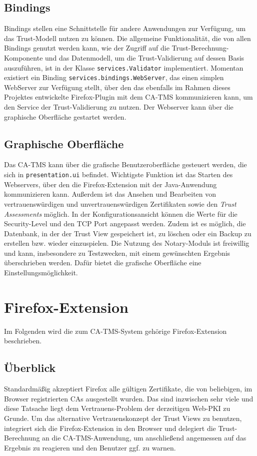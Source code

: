 \documentclass[accentcolor=tud1c,article,colorback,11pt]{tudreport}
\begin{document}
\subsection{Bindings}
Bindings stellen eine Schnittstelle für andere Anwendungen zur Verfügung, um das Trust-Modell nutzen zu können. Die allgemeine Funktionalität, die von allen Bindings genutzt werden kann, wie der Zugriff auf die Trust-Berechnung-Komponente und das Datenmodell, um die Trust-Validierung auf dessen Basis auszuführen, ist in der Klasse \texttt{services.Validator} implementiert. Momentan existiert ein Binding \texttt{services.bindings.WebServer}, das einen simplen WebServer zur Verfügung stellt, über den das ebenfalls im Rahmen dieses Projektes entwickelte Firefox-Plugin mit dem CA-TMS kommunizieren kann, um den Service der Trust-Validierung zu nutzen. Der Webserver kann über die graphische Oberfläche gestartet werden.

\subsection{Graphische Oberfläche}
Das CA-TMS kann über die grafische Benutzeroberfläche gesteuert werden, die sich in \texttt{presentation.ui} befindet. Wichtigste Funktion ist das Starten des Webservers, über den die Firefox-Extension mit der Java-Anwendung kommunizieren kann. Außerdem ist das Ansehen und Bearbeiten von vertrauenswürdigen und unvertrauenswürdigen Zertifikaten sowie den \textit{Trust Assessments} möglich. In der Konfigurationsansicht können die Werte für die Security-Level und den TCP Port angepasst werden. Zudem ist es möglich, die Datenbank, in der der Trust View gespeichert ist, zu löschen oder ein Backup zu erstellen bzw. wieder einzuspielen. Die Nutzung des Notary-Moduls ist freiwillig und kann, insbesondere zu Testzwecken, mit einem gewünschten Ergebnis überschrieben werden. Dafür bietet die grafische Oberfläche eine Einstellungsmöglichkeit.

\section{Firefox-Extension}
Im Folgenden wird die zum CA-TMS-System gehörige Firefox-Extension beschrieben.

\subsection{Überblick}
Standardmäßig akzeptiert Firefox alle gültigen Zertifikate, die von beliebigen, im Browser registrierten CAs ausgestellt wurden. Das sind inzwischen sehr viele und diese Tatsache liegt dem Vertrauens-Problem der derzeitigen Web-PKI zu Grunde. Um das alternative Vertrauenskonzept der Trust Views zu benutzen, integriert sich die Firefox-Extension in den Browser und delegiert die Trust-Berechnung an die CA-TMS-Anwendung, um anschließend angemessen auf das Ergebnis zu reagieren und den Benutzer ggf. zu warnen.
\end{document}
